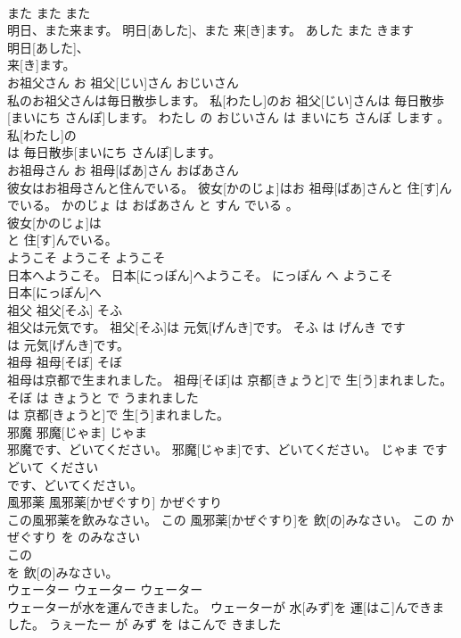 \documentclass[8pt]{extreport}
\begin{document}
\begin{CJK}{UTF8}{min}
\\	また	また	また	
\\	明日、また来ます。	明日[あした]、また 来[き]ます。	あした また きます	
\\	明日[あした]、
\\	来[き]ます。		
\\	お祖父さん	お 祖父[じい]さん	おじいさん	
\\	私のお祖父さんは毎日散歩します。	私[わたし]のお 祖父[じい]さんは 毎日散歩[まいにち さんぽ]します。	わたし の おじいさん は まいにち さんぽ します 。	
\\	私[わたし]の
\\	は 毎日散歩[まいにち さんぽ]します。		
\\	お祖母さん	お 祖母[ばあ]さん	おばあさん	
\\	彼女はお祖母さんと住んでいる。	彼女[かのじょ]はお 祖母[ばあ]さんと 住[す]んでいる。	かのじょ は おばあさん と すん でいる 。	
\\	彼女[かのじょ]は
\\	と 住[す]んでいる。		
\\	ようこそ	ようこそ	ようこそ	
\\	日本へようこそ。	日本[にっぽん]へようこそ。	にっぽん へ ようこそ	
\\	日本[にっぽん]へ
\\	祖父	祖父[そふ]	そふ	
\\	祖父は元気です。	祖父[そふ]は 元気[げんき]です。	そふ は げんき です	
\\	は 元気[げんき]です。		
\\	祖母	祖母[そぼ]	そぼ	
\\	祖母は京都で生まれました。	祖母[そぼ]は 京都[きょうと]で 生[う]まれました。	そぼ は きょうと で うまれました	
\\	は 京都[きょうと]で 生[う]まれました。		
\\	邪魔	邪魔[じゃま]	じゃま	
\\	邪魔です、どいてください。	邪魔[じゃま]です、どいてください。	じゃま です どいて ください	
\\	です、どいてください。		
\\	風邪薬	風邪薬[かぜぐすり]	かぜぐすり	
\\	この風邪薬を飲みなさい。	この 風邪薬[かぜぐすり]を 飲[の]みなさい。	この かぜぐすり を のみなさい	
\\	この
\\	を 飲[の]みなさい。		
\\	ウェーター	ウェーター	ウェーター	
\\	ウェーターが水を運んできました。	ウェーターが 水[みず]を 運[はこ]んできました。	うぇーたー が みず を はこんで きました	

\end{CJK}
\end{document}
